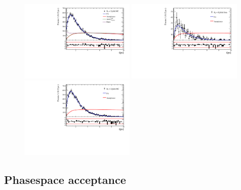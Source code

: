 \begin{figure}[h]
\includegraphics[height=!,width=0.49\textwidth]{figs/Acceptance/adaptive_N4/timeAccRatioFit_norm_mc_Run2_t1.pdf}
\includegraphics[height=!,width=0.49\textwidth]{figs/Acceptance/adaptive_N4/timeAccRatioFit_signal_B0_Run2_t1.pdf}
\includegraphics[height=!,width=0.49\textwidth]{figs/Acceptance/adaptive_N4/timeAccRatioFit_signal_mc_Run2_t1.pdf}
\caption{}
\label{fig:}
\end{figure}


\subsection{Phasespace acceptance}
\label{sec:phasespaceAcceptance}
